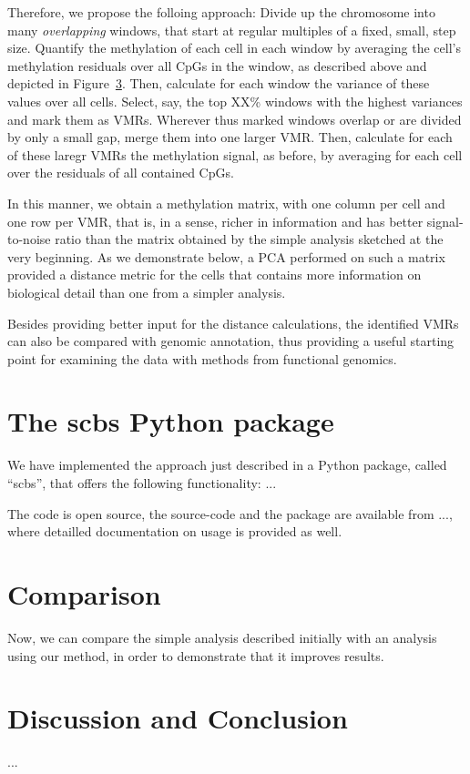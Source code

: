 \documentclass[twocolumn,10pt]{article}
\begin{document}
Therefore, we propose the folloing approach: Divide up the chromosome into many \emph{overlapping} windows, that start at regular multiples of a fixed, small, step size. Quantify the methylation of each cell in each window by averaging the cell's methylation residuals over all CpGs in the window, as described above and depicted in Figure\ \ref{}. Then, calculate for each window the variance of these values over all cells. Select, say, the top XX\% windows with the highest variances and mark them as VMRs. Wherever thus marked windows overlap or are divided by only a small gap, merge them into one larger VMR. Then, calculate for each of these laregr VMRs the methylation signal, as before, by averaging for each cell over the residuals of all contained CpGs.

In this manner, we obtain a methylation matrix, with one column per cell and one row per VMR, that is, in a sense, richer in information and has better signal-to-noise ratio than the matrix obtained by the simple analysis sketched at the very beginning. As we demonstrate below, a PCA performed on such a matrix provided a distance metric for the cells that contains more information on biological detail than one from a simpler analysis. 

Besides providing better input for the distance calculations, the identified VMRs can also be compared with genomic annotation, thus providing a useful starting point for examining the data with methods from functional genomics.

\section{The scbs Python package}

We have implemented the approach just described in a Python package, called ``scbs'', that offers the following functionality: ...

The code is open source, the source-code and the package are available from ..., where detailled documentation on usage is provided as well.

\section{Comparison}

Now, we can compare the simple analysis described initially with an analysis using our method, in order to demonstrate that it improves results.

\section{Discussion and Conclusion}

...
\end{document}
